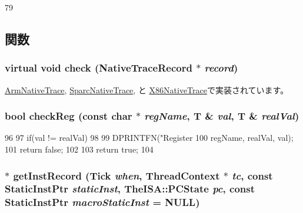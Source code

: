 \begin{DoxyCode}
79 {}
\end{DoxyCode}


\subsection{関数}
\hypertarget{classTrace_1_1NativeTrace_adb484644aa43b4370d31b6a7286b0dd1}{
\subsubsection[{check}]{\setlength{\rightskip}{0pt plus 5cm}virtual void check ({\bf NativeTraceRecord} $\ast$ {\em record})}}
\label{classTrace_1_1NativeTrace_adb484644aa43b4370d31b6a7286b0dd1}


\hyperlink{classTrace_1_1ArmNativeTrace_a826e1279dfa7dd9ce6760a2e6efe4116}{ArmNativeTrace}, \hyperlink{classTrace_1_1SparcNativeTrace_a826e1279dfa7dd9ce6760a2e6efe4116}{SparcNativeTrace}, と \hyperlink{classTrace_1_1X86NativeTrace_a826e1279dfa7dd9ce6760a2e6efe4116}{X86NativeTrace}で実装されています。\hypertarget{classTrace_1_1NativeTrace_a1d9546c7840deae793284f3dcafeb684}{
\subsubsection[{checkReg}]{\setlength{\rightskip}{0pt plus 5cm}bool checkReg (const char $\ast$ {\em regName}, \/  T \& {\em val}, \/  T \& {\em realVal})}}
\label{classTrace_1_1NativeTrace_a1d9546c7840deae793284f3dcafeb684}



\begin{DoxyCode}
96     {
97         if(val != realVal)
98         {
99             DPRINTFN("Register %
100                     regName, realVal, val);
101             return false;
102         }
103         return true;
104     }
\end{DoxyCode}
\hypertarget{classTrace_1_1NativeTrace_ad520c1272aab137c3e207f526088843c}{
\subsubsection[{getInstRecord}]{$\ast$ getInstRecord ({\bf Tick} {\em when}, \/  {\bf ThreadContext} $\ast$ {\em tc}, \/  const {\bf StaticInstPtr} {\em staticInst}, \/  TheISA::PCState {\em pc}, \/  const {\bf StaticInstPtr} {\em macroStaticInst} = {\ttfamily NULL})}}
\label{classTrace_1_1NativeTrace_ad520c1272aab137c3e207f526088843c}


